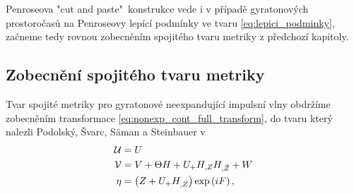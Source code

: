 Penroseova "cut and paste"\ konstrukce vede i v případě gyratonových prostoročasů na Penroseovy lepící podmínky ve tvaru \eqref{eq:lepici_podminky}, začneme tedy rovnou zobecněním
spojitého tvaru metriky z předchozí kapitoly.

\subsection{Zobecnění spojitého tvaru metriky}
Tvar spojité metriky pro gyratonové neexpandující impulsní vlny obdržíme zobecněním transformace \eqref{eq:nonexp_cont_full_transform},
do tvaru který nalezli Podolský, Švarc, Säman a Steinbauer v \cite{Podolsky_2017}
\begin{equation}
    \label{eq:gyraton_cont_transformation}
    \begin{split}
        \mathcal{U} &= U \\
        \mathcal{V} &= V + \Theta H + U_{+} H_{,Z} H_{,\bar{Z}} + W \\
        \eta &= \left(Z + U_{+} H_{,\bar{Z}}\right) \exp \left(i F \right),
    \end{split}
\end{equation}

